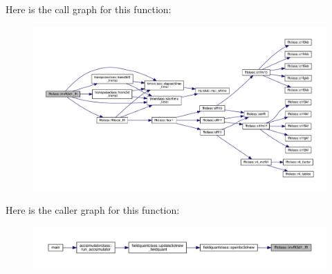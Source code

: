 Here is the call graph for this function\+:
\nopagebreak
\begin{figure}[H]
\begin{center}
\leavevmode
\includegraphics[width=350pt]{namespacefftclass_a21e8a7bd2877ec439bc4f0e0bc0e4681_cgraph}
\end{center}
\end{figure}
Here is the caller graph for this function\+:\nopagebreak
\begin{figure}[H]
\begin{center}
\leavevmode
\includegraphics[width=350pt]{namespacefftclass_a21e8a7bd2877ec439bc4f0e0bc0e4681_icgraph}
\end{center}
\end{figure}
\mbox{\label{namespacefftclass_a374c599138aeca237d4c303a07a470ee}} 
